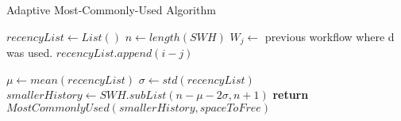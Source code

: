 \begin{algorithm}
\begin{singlespace}
\caption{Adaptive Most-Commonly-Used Algorithm}
\label{alg:adaptive_most_commonly_used_decision}
\begin{algorithmic}[1]
	\State $recencyList \gets List()$
	\State $n \gets length(SWH)$
			\State $W_j \gets$ previous workflow where d was used.
				\State $recencyList.append(i - j)$
			\EndIf
		\EndFor
			
	\EndFor
	\State $\mu \gets mean(recencyList)$
	\State $\sigma \gets std(recencyList)$
	\State $smallerHistory \gets SWH.subList(n - \mu - 2\sigma, n + 1)$
	\State \textbf{return} $MostCommonlyUsed(smallerHistory, spaceToFree)$

\EndProcedure
\end{algorithmic}
\end{singlespace}
\end{algorithm}





